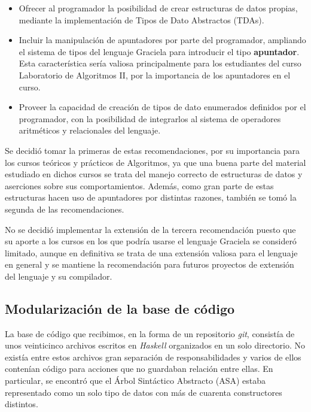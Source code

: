 \begin{itemize}

  \item Ofrecer al programador la posibilidad de crear estructuras de datos
  propias, mediante la implementación de Tipos de Dato Abstractos (TDAs).

  \item Incluir la manipulación de apuntadores por parte del programador,
  ampliando el sistema de tipos del lenguaje Graciela para introducir el tipo
  \textbf{apuntador}. Esta característica sería valiosa principalmente para los
  estudiantes del curso Laboratorio de Algoritmos II, por la importancia de los
  apuntadores en el curso.

  \item Proveer la capacidad de creación de tipos de dato enumerados definidos
  por el programador, con la posibilidad de integrarlos al sistema de operadores
  aritméticos y relacionales del lenguaje.

\end{itemize}

Se decidió tomar la primeras de estas recomendaciones, por su importancia para
los cursos teóricos y prácticos de Algoritmos, ya que una buena parte del
material estudiado en dichos cursos se trata del manejo correcto de estructuras
de datos y aserciones sobre sus comportamientos. Además, como gran parte de
estas estructuras hacen uso de apuntadores por distintas razones, también se
tomó la segunda de las recomendaciones.

No se decidió implementar la extensión de la tercera recomendación puesto que su
aporte a los cursos en los que podría usarse el lenguaje Graciela se consideró
limitado, aunque en definitiva se trata de una extensión valiosa para el
lenguaje en general y se mantiene la recomendación para futuros proyectos de
extensión del lenguaje y su compilador.

\subsection{Modularización de la base de código}

La base de código que recibimos, en la forma de un repositorio \emph{git},
consistía de unos veinticinco archivos escritos en \emph{Haskell} organizados en
un solo directorio. No existía entre estos archivos gran separación de
responsabilidades y varios de ellos contenían código para acciones que no
guardaban relación entre ellas. En particular, se encontró que el Árbol
Sintáctico Abstracto (\textsc{ASA}) estaba representado como un solo tipo de
datos con más de cuarenta constructores distintos.

